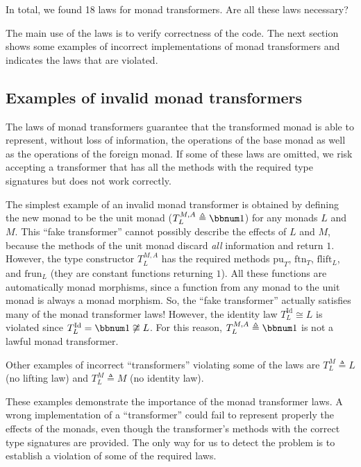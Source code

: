 In total, we found 18 laws for monad transformers. Are all these laws
necessary? 

The main use of the laws is to verify correctness of the code. The
next section shows some examples of incorrect implementations of monad
transformers and indicates the laws that are violated.

\subsection{Examples of invalid monad transformers}

The laws of monad transformers guarantee that the transformed monad
is able to represent, without loss of information, the operations
of the base monad as well as the operations of the foreign monad.
If some of these laws are omitted, we risk accepting a transformer
that has all the methods with the required type signatures but does
not work correctly.

The simplest example of an invalid monad transformer is obtained by
defining the new monad to be the unit monad ($T_{L}^{M,A}\triangleq\bbnum 1$)
for any monads $L$ and $M$. This \textsf{``}fake transformer\textsf{''} cannot possibly
describe the effects of $L$ and $M$, because the methods of the
unit monad discard \emph{all} information and return $1$. However,
the type constructor $T_{L}^{M,A}$ has the required methods $\text{pu}_{T}$,
$\text{ftn}_{T}$, $\text{flift}_{L}$, and $\text{frun}_{L}$ (they
are constant functions returning $1$). All these functions are automatically
monad morphisms, since a function from any monad to the unit monad
is always a monad morphism. So, the \textsf{``}fake transformer\textsf{''} actually
satisfies many of the monad transformer laws! However, the identity
law $T_{L}^{\text{Id}}\cong L$ is violated since $T_{L}^{\text{Id}}=\bbnum 1\not\cong L$.
For this reason, $T_{L}^{M,A}\triangleq\bbnum 1$ is not a lawful
monad transformer.

Other examples of incorrect \textsf{``}transformers\textsf{''} violating some of the
laws are $T_{L}^{M}\triangleq L$ (no lifting law) and $T_{L}^{M}\triangleq M$
(no identity law).

These examples demonstrate the importance of the monad transformer
laws. A wrong implementation of a \textsf{``}transformer\textsf{''} could fail to
represent properly the effects of the monads, even though the transformer\textsf{'}s
methods with the correct type signatures are provided. The only way
for us to detect the problem is to establish a violation of some of
the required laws.


